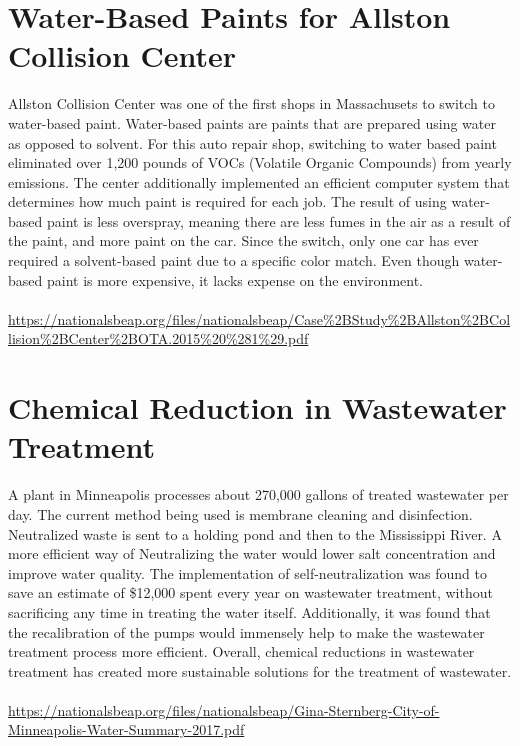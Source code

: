 \documentclass{article}
\begin{document}
\begin{spacing}{2.15}
    \section{Water-Based Paints for Allston Collision Center}
    \indent Allston Collision Center was one of the first shops in Massachusets to switch to water-based paint. Water-based paints are paints that are prepared using water as opposed to solvent. For this auto repair shop, switching to water based paint eliminated over 1,200 pounds of VOCs (Volatile Organic Compounds) from yearly emissions. The center additionally implemented an efficient computer system that determines how much paint is required for each job. The result of using water-based paint is less overspray, meaning there are less fumes in the air as a result of the paint, and more paint on the car. Since the switch, only one car has ever required a solvent-based paint due to a specific color match. Even though water-based paint is more expensive, it lacks expense on the environment. \\\\ 
    \url{https://nationalsbeap.org/files/nationalsbeap/Case%2BStudy%2BAllston%2BCollision%2BCenter%2BOTA.2015%20%281%29.pdf}
    \newpage
    \section{Chemical Reduction in Wastewater Treatment}
    \indent A plant in Minneapolis processes about 270,000 gallons of treated wastewater per day. The current method being used is membrane cleaning and disinfection. Neutralized waste is sent to a holding pond and then to the Mississippi River. A more efficient way of Neutralizing the water would lower salt concentration and improve water quality. The implementation of self-neutralization was found to save an estimate of \$12,000 spent every year on wastewater treatment, without sacrificing any time in treating the water itself. Additionally, it was found that the recalibration of the pumps would immensely help to make the wastewater treatment process more efficient. Overall, chemical reductions in wastewater treatment has created more sustainable solutions for the treatment of wastewater. \\\\
    \url{https://nationalsbeap.org/files/nationalsbeap/Gina-Sternberg-City-of-Minneapolis-Water-Summary-2017.pdf}

\end{spacing}
\end{document}
